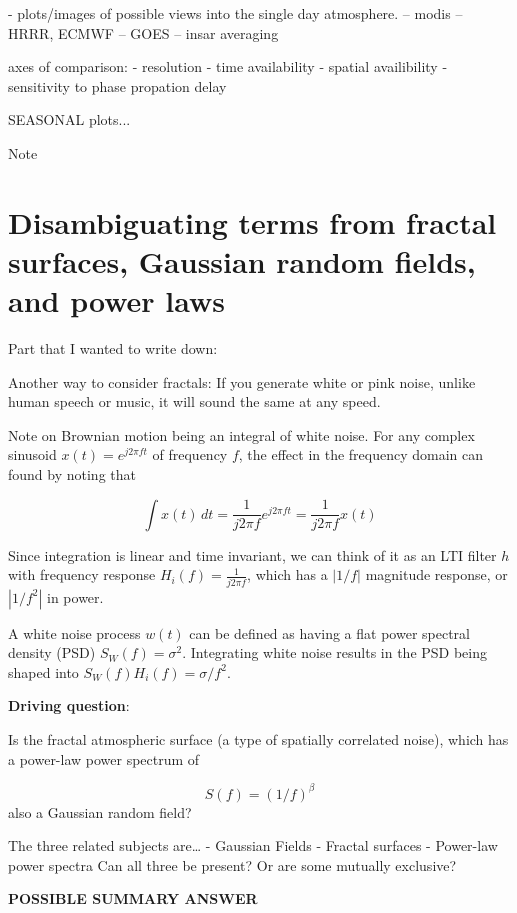 \documentclass{utexasthesis}
\begin{document}
- plots/images of possible views into the single day atmosphere.
 -- modis
 -- HRRR, ECMWF
 --  GOES
 -- insar averaging
 
 axes of comparison:
 - resolution
 - time availability
 - spatial availibility
 - sensitivity to phase propation delay
 
 
 SEASONAL plots...
 
 Note

\section{Disambiguating terms from fractal surfaces, Gaussian random
fields, and power
laws}
\label{disambiguating-terms-from-fractal-surfaces-gaussian-random-fields-and-power-laws}

Part that I wanted to write down:

Another way to consider fractals: If you generate white or pink noise, unlike human speech or music, it will sound the same at any speed.

Note on Brownian motion being an integral of white noise.
For any complex sinusoid $x(t) = e^{j2 \pi f t}$ of frequency $f$, the effect in the frequency domain can found by noting that 

\begin{equation}
\int x(t) \, dt = \frac{1}{j 2 \pi f} e^{j2\pi f t} = \frac{1}{j 2 \pi f} x(t)
\end{equation}

Since integration is linear and time invariant, we can think of it as an LTI filter $h$ with frequency response $H_i(f) = \frac{1}{j 2 \pi f} $, which has a $|1/f|$ magnitude response, or $|1/f^2|$ in power.

A white noise process $w(t)$ can be defined as having a flat power spectral density (PSD) $S_W(f) = \sigma^2$. Integrating white noise results in the PSD being shaped into $S_W(f) H_i(f) = \sigma / f^2$.

\textbf{Driving question}:

Is the fractal atmospheric surface (a type of spatially correlated
noise), which has a power-law power spectrum of

\[S(f) = (1/f)^{\beta}\] also a Gaussian random field?

The three related subjects are\ldots{} - Gaussian Fields - Fractal
surfaces - Power-law power spectra Can all three be present? Or are some
mutually exclusive?

\textbf{POSSIBLE SUMMARY ANSWER}
\end{document}
